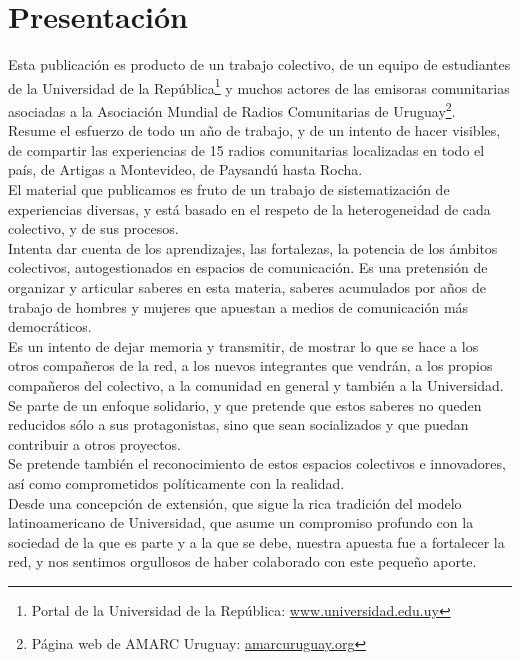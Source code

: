 {}
\chapter*{Presentación}

Esta publicación es producto de un trabajo colectivo, de un equipo de estudiantes de la Universidad de la República\footnote{Portal de la Universidad de la República: \href{http://www.universidad.edu.uy}{www.universidad.edu.uy}} y muchos actores de las emisoras comunitarias asociadas a la Asociación Mundial de Radios Comunitarias de Uruguay\footnote{Página web de AMARC Uruguay: \href{http://amarcuruguay.org}{amarcuruguay.org}}.\\

Resume el esfuerzo de todo un año de trabajo, y de un intento de hacer visibles, de compartir las experiencias de 15 radios comunitarias localizadas en todo el país, de Artigas a Montevideo, de Paysandú hasta Rocha.\\

El material que publicamos es fruto de un trabajo de sistematización de experiencias diversas, y está basado en el respeto de la heterogeneidad de cada colectivo, y de sus procesos.\\

Intenta dar cuenta de los aprendizajes, las fortalezas, la potencia de los ámbitos colectivos, autogestionados en espacios de comunicación. Es una pretensión de organizar y articular saberes en esta materia, saberes acumulados por años de trabajo de hombres y mujeres que apuestan a medios de comunicación más democráticos.\\

Es un intento de dejar memoria y transmitir, de mostrar lo que se hace a los otros compañeros de la red, a los nuevos integrantes que vendrán, a los propios compañeros del colectivo, a la comunidad en general y también a la Universidad.\\

Se parte de un enfoque solidario, y que pretende que estos saberes no queden reducidos sólo a sus protagonistas, sino que sean socializados y que puedan contribuir a otros proyectos.\\

Se pretende también el reconocimiento de estos espacios colectivos e innovadores, así como comprometidos políticamente con la realidad.\\

Desde una concepción de extensión, que sigue la rica tradición del modelo latinoamericano de Universidad, que asume un compromiso profundo con la sociedad de la que es parte y a la que se debe, nuestra apuesta fue a fortalecer la red, y nos sentimos orgullosos de haber colaborado con este pequeño aporte.\\

